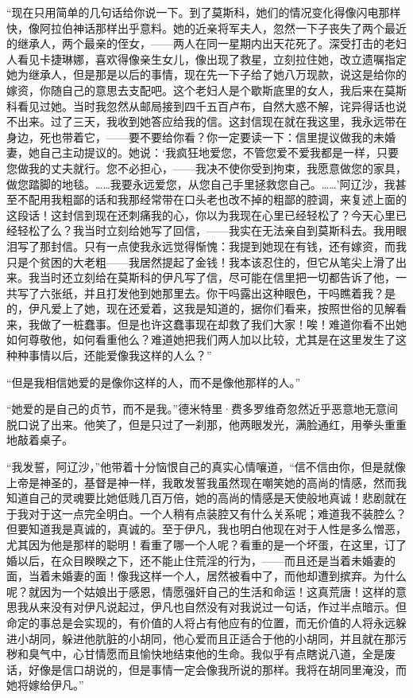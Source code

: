 \par “现在只用简单的几句话给你说一下。到了莫斯科，她们的情况变化得像闪电那样快，像阿拉伯神话那样出乎意料。她的近亲将军夫人，忽然一下子丧失了两个最近的继承人，两个最亲的侄女，——两人在同一星期内出天花死了。深受打击的老妇人看见卡捷琳娜，喜欢得像亲生女儿，像出现了救星，立刻拉住她，改立遗嘱指定她为继承人，但是那是以后的事情，现在先一下子给了她八万现款，说这是给你的嫁资，你随自己的意思去支配吧。这个老妇人是个歇斯底里的女人，我后来在莫斯科看见过她。当时我忽然从邮局接到四千五百卢布，自然大惑不解，诧异得话也说不出来。过了三天，我收到她答应给我的信。这封信现在就在我这里，我永远带在身边，死也带着它，——要不要给你看？你一定要读一下：信里提议做我的未婚妻，她自己主动提议的。她说：‘我疯狂地爱您，不管您爱不爱我都是一样，只要您做我的丈夫就行。您不必担心，——我决不使你受到拘束，我愿意做您的家具，做您踏脚的地毯。……我要永远爱您，从您自己手里拯救您自己。……’阿辽沙，我甚至不配用我粗鄙的话和我那经常带在口头老也改不掉的粗鄙的腔调，来复述上面的这段话！这封信到现在还刺痛我的心，你以为我现在心里已经轻松了？今天心里已经轻松了么？我当时立刻给她写了回信，——我实在无法亲自到莫斯科去。我用眼泪写了那封信。只有一点使我永远觉得惭愧：我提到她现在有钱，还有嫁资，而我只是个贫困的大老粗——我居然提起了金钱！我本该忍住的，但它从笔尖上滑了出来。我当时还立刻给在莫斯科的伊凡写了信，尽可能在信里把一切都告诉了他，一共写了六张纸，并且打发他到她那里去。你干吗露出这种眼色，干吗瞧着我？是的，伊凡爱上了她，现在还爱着，这我是知道的，据你们看来，按照世俗的见解看来，我做了一桩蠢事。但是也许这蠢事现在却救了我们大家！唉！难道你看不出她如何尊敬他，如何看重他么？难道她把我们两人加以比较，尤其是在这里发生了这种种事情以后，还能爱像我这样的人么？”
\par “但是我相信她爱的是像你这样的人，而不是像他那样的人。”
\par “她爱的是自己的贞节，而不是我。”德米特里·费多罗维奇忽然近乎恶意地无意间脱口说了出来。他笑了，但是只过了一刹那，他两眼发光，满脸通红，用拳头重重地敲着桌子。
\par “我发誓，阿辽沙，”他带着十分恼恨自己的真实心情嚷道，“信不信由你，但是就像上帝是神圣的，基督是神一样，我敢发誓我虽然现在嘲笑她的高尚的情感，然而我知道自己的灵魂要比她低贱几百万倍，她的高尚的情感是天使般地真诚！悲剧就在于我对于这一点完全明白。一个人稍有点装腔又有什么关系呢；难道我不装腔么？但要知道我是真诚的，真诚的。至于伊凡，我也明白他现在对于人性是多么憎恶，尤其因为他是那样的聪明！看重了哪一个人呢？看重的是一个坏蛋，在这里，订了婚以后，在众目睽睽之下，还不能止住荒淫的行为，——而且还是当着未婚妻的面，当着未婚妻的面！像我这样一个人，居然被看中了，而他却遭到摈弃。为什么呢？就因为一个姑娘出于感恩，情愿强奸自己的生活和命运！这真荒唐！这样的意思我从来没有对伊凡说起过，伊凡也自然没有对我说过一句话，作过半点暗示。但命定的事总是会实现的，有价值的人将占有他应有的位置，而无价值的人将永远躲进小胡同，躲进他肮脏的小胡同，他心爱而且正适合于他的小胡同，并且就在那污秽和臭气中，心甘情愿而且愉快地结束他的生命。我似乎有点瞎说八道，全是废话，好像是信口胡说的，但是事情一定会像我所说的那样。我将在胡同里淹没，而她将嫁给伊凡。”
